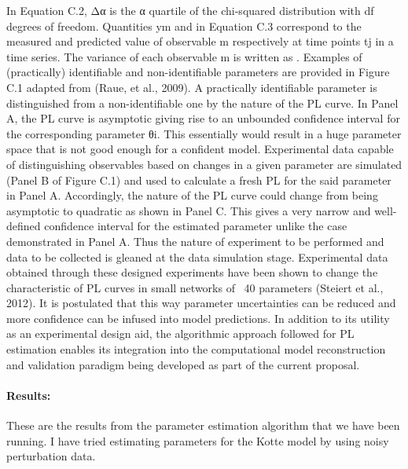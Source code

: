 \documentclass[10pt]{report}
\begin{document}
In Equation C.2, Δα is the α quartile of the chi-squared distribution with df degrees of freedom. Quantities ym and   in Equation C.3 correspond to the measured and predicted value of observable m respectively at time points tj in a time series. The variance of each observable m is written as  . 
Examples of (practically) identifiable and non-identifiable parameters are provided in Figure C.1 adapted from (Raue, et al., 2009). A practically identifiable parameter is distinguished from a non-identifiable one by the nature of the PL curve. In Panel A, the PL curve is asymptotic giving rise to an unbounded confidence interval for the corresponding parameter θi. This essentially would result in a huge parameter space that is not good enough for a confident model. Experimental data capable of distinguishing observables based on changes in a given parameter are simulated (Panel B of Figure C.1) and used to calculate a fresh PL for the said parameter in Panel A. Accordingly, the nature of the PL curve could change from being asymptotic to quadratic as shown in Panel C. This gives a very narrow and well-defined confidence interval for the estimated parameter unlike the case demonstrated in Panel A. Thus the nature of experiment to be performed and data to be collected is gleaned at the data simulation stage. Experimental data obtained through these designed experiments have been shown to change the characteristic of PL curves in small networks of ~40 parameters (Steiert et al., 2012). It is postulated that this way parameter uncertainties can be reduced and more confidence can be infused into model predictions. In addition to its utility as an experimental design aid, the algorithmic approach followed for PL estimation enables its integration into the computational model reconstruction and validation paradigm being developed as part of the current proposal.


	\paragraph{Results:}
	These are the results from the parameter estimation algorithm that we have been running. I have tried estimating parameters for the Kotte model by using noisy perturbation data.
	
\end{document}
